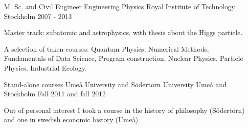 


\begin{cventries}

\cventry
{M. Sc. and Civil Engineer Engineering Physics} %
{Royal Institute of Technology} %
{Stockholm} %
{2007 - 2013} %
{ %
\begin{cvitems}
\item {Master track: subatomic and astrophysics, with thesis about the Higgs particle.}
\item {A selection of taken courses: Quantum Physics, Numerical Methods, Fundamentals of Data Science, Program construction, Nuclear Physics, Particle Physics, Industrial Ecology.
}
\end{cvitems}
}

\cventry
{Stand-alone courses} %
{Ume{\aa} University and S{\"o}dert{\"o}rn University} %
{Ume{\aa} and Stockholm} %
{Fall 2011 and fall 2012} %
{ %
\begin{cvitems}
\item {Out of personal interest I took a course in the history of philosophy (S{\"o}dert{\"o}rn) and one in swedish economic history (Ume{\aa}).
}
\end{cvitems}
}

\end{cventries}